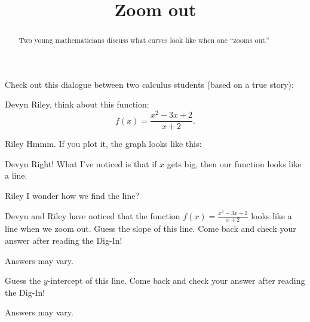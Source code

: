 \documentclass{ximera}
\title[Break-Ground:]{Zoom out}
\begin{document}
\begin{abstract}
Two young mathematicians discuss what curves look like when one
``zooms out.''
\end{abstract}
\maketitle

Check out this dialogue between two calculus students (based on a true
story):

\begin{dialogue}
\item[Devyn] Riley, think about this function:
  \[
  f(x) = \frac{x^2-3x+2}{x+2}.
  \]
\item[Riley] Hmmm. If you plot it, the graph looks like this:
  \begin{image}
  \end{image}
\item[Devyn] Right! What I've noticed is that if $x$ gets big, then
  our function looks like a line.
\item[Riley] I wonder how we find the line? 
\end{dialogue}

\begin{problem}
Devyn and Riley have noticed that the function $f(x) = \frac{x^2 - 3x
  + 2}{x+2}$ looks like a line when we zoom out.  Guess the slope of
this line.  Come back and check your answer after reading the Dig-In!
\begin{freeResponse}
Answers may vary.
\end{freeResponse}
\end{problem}

\begin{problem}
   Guess the $y$-intercept of this line.  Come back and check your
   answer after reading the Dig-In!
   \begin{freeResponse}
   Answers may vary.
   \end{freeResponse}
\end{problem}




\end{document}

